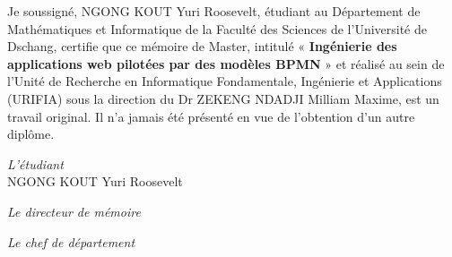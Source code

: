 
Je soussigné, NGONG KOUT Yuri Roosevelt, étudiant au Département de Mathématiques et Informatique de la Faculté des Sciences de l'Université de Dschang, certifie que ce mémoire de Master, intitulé « \textbf{Ingénierie des applications web pilotées par des modèles BPMN} » et réalisé au sein de l'Unité de Recherche en Informatique Fondamentale, Ingénierie et Applications (URIFIA) sous la direction du Dr ZEKENG NDADJI Milliam Maxime, est un travail original. Il n'a jamais été présenté en vue de l'obtention d'un autre diplôme.

\vspace{1cm}
\vspace{1cm}
\begin{center}
\textit{L'étudiant} \\
NGONG KOUT Yuri Roosevelt \\
\vspace{1cm}

\vspace{1cm}

\textit{Le directeur de mémoire} \\
\vspace{2cm}


\vspace{2cm}
\textit{Le chef de département} \\

\vspace{2cm}

\end{center}
